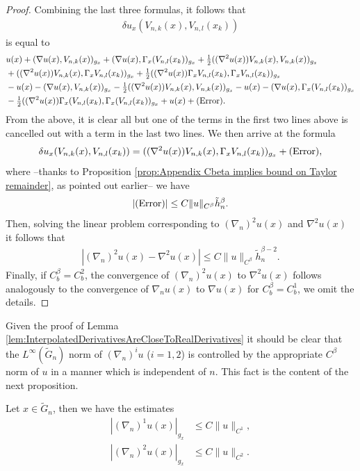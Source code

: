 \documentclass[11pt,reqno]{amsart}
\numberwithin{equation}{section}
\theoremstyle{plain}
\begin{document}
\begin{proof}
  Combining the last three formulas, it follows that
  \begin{align*}
    \delta u_{x}(V_{n,k}(x),V_{n,l}(x_k))
  \end{align*}
  is equal to
  \begin{align*}
    & u(x)+(\nabla u(x),V_{n,k}(x))_{g_x}+(\nabla u(x),\Gamma_x(V_{n,l}(x_k))_{g_x}+\tfrac{1}{2}((\nabla^2 u(x))V_{n,k}(x),V_{n,k}(x))_{g_x}\\
    & +((\nabla^2u(x))V_{n,k}(x),\Gamma_xV_{n,l}(x_k))_{g_x}+\tfrac{1}{2}((\nabla^2u(x))\Gamma_xV_{n,l}(x_k),\Gamma_xV_{n,l}(x_k))_{g_x}\\
    & -u(x)-(\nabla u(x),V_{n,k}(x))_{g_x}-\tfrac{1}{2}((\nabla^2u(x))V_{n,k}(x),V_{n,k}(x))_{g_x}-u(x)-(\nabla u(x),\Gamma_x(V_{n,l}(x_k))_{g_x}\\
    &-\tfrac{1}{2}((\nabla^2 u(x))\Gamma_x(V_{n,l}(x_k),\Gamma_x(V_{n,l}(x_k))_{g_x}+u(x)+\textnormal{(Error)}.
  \end{align*}
  From the above, it is clear all but one of the terms in the first two lines above is cancelled out with a term in the last two lines. We then arrive at the formula
  \begin{align*}
    \delta u_{x}(V_{n,k}(x),V_{n,l}(x_k)) =  ((\nabla^2u(x))V_{n,k}(x),\Gamma_xV_{n,l}(x_k))_{g_x}+\textnormal{(Error)},
  \end{align*}
  where --thanks to Proposition \ref{prop:Appendix Cbeta implies bound on Taylor remainder}, as pointed out earlier-- we have
  \begin{align*}
    |\textnormal{(Error)}| \leq C\|u\|_{C^\beta}\tilde h_n^\beta. 
  \end{align*}  
  Then, solving the linear problem corresponding to $(\nabla_n)^2u(x)$ and $\nabla^2u(x)$ it follows that
  \begin{align*}
    |(\nabla_n)^2u(x)-\nabla^2 u(x)|\leq C\|u\|_{C^\beta}\tilde h_n^{\beta-2}.
  \end{align*}
  Finally, if $C^\beta_b = C^2_b$, the convergence of $(\nabla_n)^2u(x)$ to $\nabla^2u(x)$ follows analogously to the convergence of $\nabla_n u(x)$ to $\nabla u(x)$ for $C^\beta_b = C^1_b$,  we omit the details.
\end{proof}

Given the proof of Lemma \ref{lem:InterpolatedDerivativesAreCloseToRealDerivatives} it should be clear that the $L^\infty(\tilde G_n)$ norm of $(\nabla_n)^iu$ ($i=1,2$) is controlled by the appropriate $C^\beta$ norm of $u$ in a manner which is independent of $n$. This fact is the content of the next proposition.
\begin{prop}\label{prop: discrete derivatives are controlled by continuous derivatives}
  Let $x \in \tilde G_n$, then we have the estimates
  \begin{align*}
    |(\nabla_n)^1u(x)|_{g_x} & \leq C\|u\|_{C^1},\\
    |(\nabla_n)^2u(x)|_{g_x} & \leq C\|u\|_{C^2}.
  \end{align*}
  
\end{prop}
\end{document}

